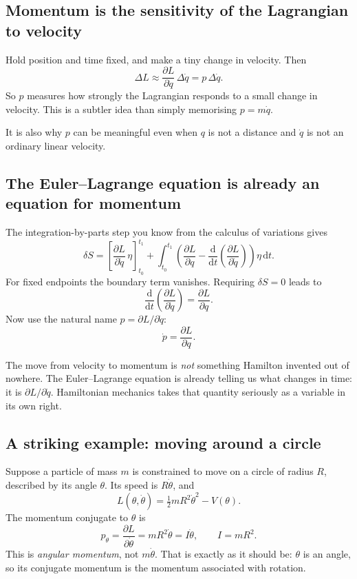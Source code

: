 \documentclass[11pt,a4paper,oneside]{article}
\newcommand{\dd}{\,\mathrm d}
\newcommand{\pd}[2]{\frac{\partial #1}{\partial #2}}
\newcommand{\dt}[1]{\frac{\mathrm d #1}{\mathrm d t}}
\begin{document}
\subsection{Momentum is the sensitivity of the Lagrangian to velocity}
Hold position and time fixed, and make a tiny change in velocity. Then
\[
 \Delta L\approx\pd{L}{\dot q}\,\Delta\dot q=p\,\Delta\dot q.
\]
So $p$ measures how strongly the Lagrangian responds to a small change in velocity. This is a subtler idea than simply memorising $p=m\dot q$.

It is also why $p$ can be meaningful even when $q$ is not a distance and $\dot q$ is not an ordinary linear velocity.

\subsection{The Euler--Lagrange equation is already an equation for momentum}
The integration-by-parts step you know from the calculus of variations gives
\[
 \delta S=
 \left[\pd{L}{\dot q}\,\eta\right]_{t_0}^{t_1}
 +\int_{t_0}^{t_1}
 \left(\pd{L}{q}-\dt{}\left(\pd{L}{\dot q}\right)\right)\eta\dd t.
\]
For fixed endpoints the boundary term vanishes. Requiring $\delta S=0$ leads to
\[
 \dt{}\left(\pd{L}{\dot q}\right)=\pd{L}{q}.
\]
Now use the natural name $p=\partial L/\partial\dot q$:
\begin{equation}\label{eq:eulerp}
 \boxed{\dot p=\pd{L}{q}.}
\end{equation}

\begin{intuition}
The move from velocity to momentum is \emph{not} something Hamilton invented out of nowhere. The Euler--Lagrange equation is already telling us what changes in time: it is $\partial L/\partial\dot q$. Hamiltonian mechanics takes that quantity seriously as a variable in its own right.
\end{intuition}

\subsection{A striking example: moving around a circle}
Suppose a particle of mass $m$ is constrained to move on a circle of radius $R$, described by its angle $\theta$. Its speed is $R\dot\theta$, and
\[
 L(\theta,\dot\theta)=\tfrac12mR^2\dot\theta^2-V(\theta).
\]
The momentum conjugate to $\theta$ is
\[
 \boxed{p_\theta=\pd{L}{\dot\theta}=mR^2\dot\theta=I\dot\theta,\qquad I=mR^2.}
\]
This is \emph{angular momentum}, not $m\dot\theta$. That is exactly as it should be: $\theta$ is an angle, so its conjugate momentum is the momentum associated with rotation.
\end{document}
